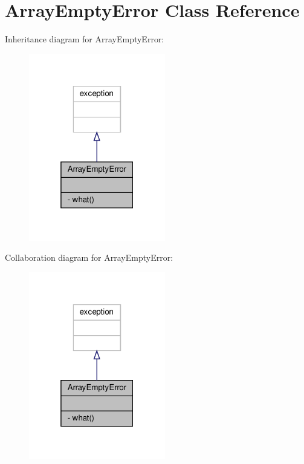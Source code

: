 \hypertarget{classArrayEmptyError}{}\section{Array\+Empty\+Error Class Reference}
\label{classArrayEmptyError}


Inheritance diagram for Array\+Empty\+Error\+:
\nopagebreak
\begin{figure}[H]
\begin{center}
\leavevmode
\includegraphics[width=169pt]{classArrayEmptyError__inherit__graph}
\end{center}
\end{figure}


Collaboration diagram for Array\+Empty\+Error\+:
\nopagebreak
\begin{figure}[H]
\begin{center}
\leavevmode
\includegraphics[width=169pt]{classArrayEmptyError__coll__graph}
\end{center}
\end{figure}
